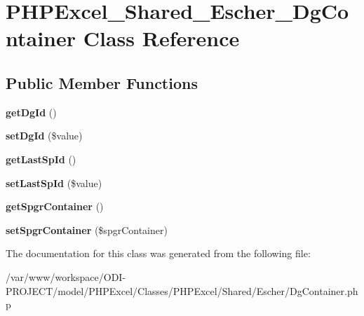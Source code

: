 \section{P\+H\+P\+Excel\+\_\+\+Shared\+\_\+\+Escher\+\_\+\+Dg\+Container Class Reference}
\label{class_p_h_p_excel___shared___escher___dg_container}
\subsection*{Public Member Functions}
\begin{DoxyCompactItemize}
\item 
{\bfseries get\+Dg\+Id} ()\label{class_p_h_p_excel___shared___escher___dg_container_a5e321742cceee772c13eb56652d97941}

\item 
{\bfseries set\+Dg\+Id} (\$value)\label{class_p_h_p_excel___shared___escher___dg_container_a806255957085da8f9f3a2a4870189d04}

\item 
{\bfseries get\+Last\+Sp\+Id} ()\label{class_p_h_p_excel___shared___escher___dg_container_a5ed5df09ae774c929ec1e494f1c3e823}

\item 
{\bfseries set\+Last\+Sp\+Id} (\$value)\label{class_p_h_p_excel___shared___escher___dg_container_ab0cb0b570f53c899e95b8d8a3f5c15aa}

\item 
{\bfseries get\+Spgr\+Container} ()\label{class_p_h_p_excel___shared___escher___dg_container_acd2ae4ab0bc5b694bf4a2128ed04412a}

\item 
{\bfseries set\+Spgr\+Container} (\$spgr\+Container)\label{class_p_h_p_excel___shared___escher___dg_container_a63da53a0ee21f858d707caadebf47a11}

\end{DoxyCompactItemize}


The documentation for this class was generated from the following file\+:\begin{DoxyCompactItemize}
\item 
/var/www/workspace/\+O\+D\+I-\/\+P\+R\+O\+J\+E\+C\+T/model/\+P\+H\+P\+Excel/\+Classes/\+P\+H\+P\+Excel/\+Shared/\+Escher/Dg\+Container.\+php\end{DoxyCompactItemize}
